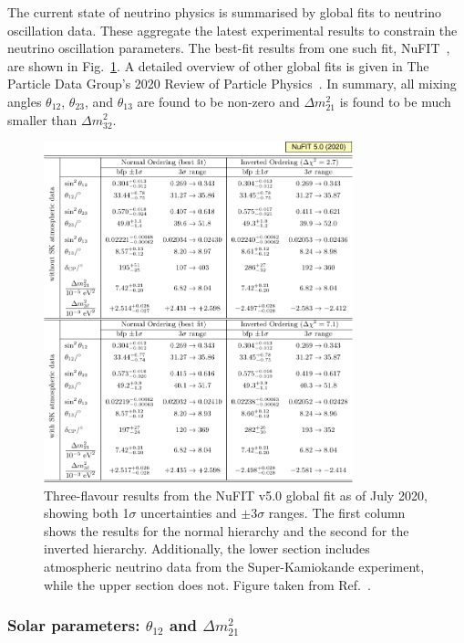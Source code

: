 The current state of neutrino physics is summarised by global fits to neutrino oscillation data.
These aggregate the latest experimental results to constrain the neutrino oscillation parameters.
The best-fit results from one such fit, NuFIT~\cite{esteban2019,esteban2020}, are shown in
Fig.~\ref{fig:best_fit}. A detailed overview of other global fits is given in The Particle Data
Group's 2020 Review of Particle Physics~\cite{particle2020}. In summary, all mixing angles
$\theta_{12}$, $\theta_{23}$, and $\theta_{13}$ are found to be non-zero and $\Delta m^{2}_{21}$
is found to be much smaller than $\Delta m^{2}_{32}$.

\begin{figure} %
    \includegraphics[origin=c,width=0.8\textwidth]{diagrams/3-theory/best_fit.pdf}
    \caption[best fit short]
    {Three-flavour results from the NuFIT v5.0 global fit as of July 2020, showing both 1$\sigma$
        uncertainties and $\pm 3 \sigma$ ranges. The first column shows the results for the normal
        hierarchy and the second for the inverted hierarchy. Additionally, the lower section
        includes atmospheric neutrino data from the Super-Kamiokande experiment, while the upper
        section does not. Figure taken from Ref.~\cite{esteban2020}.}
    \label{fig:best_fit}
\end{figure}

\subsubsection*{Solar parameters: $\theta_{12}$ and $\Delta m^{2}_{21}$} %

